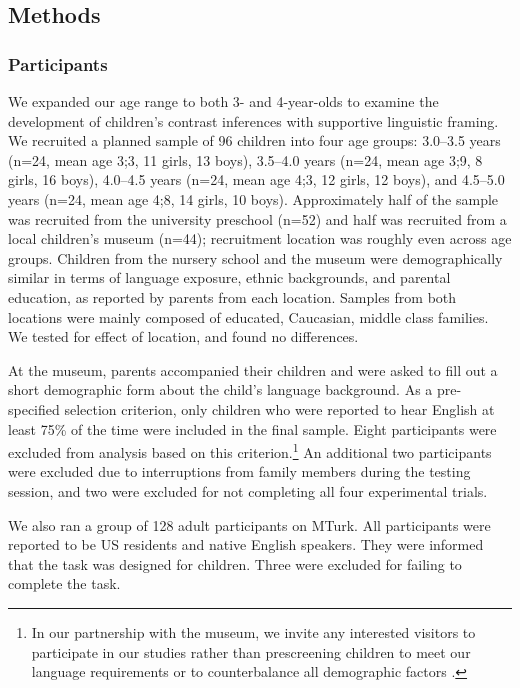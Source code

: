 \documentclass[man]{apa2}
\begin{document}
\subsection{Methods}

\subsubsection{Participants}

We expanded our age range to both 3- and 4-year-olds to examine the development of children's contrast inferences with supportive linguistic framing. We recruited a planned sample of 96 children into four age groups: 3.0--3.5 years (n=24, mean age 3;3, 11 girls, 13 boys), 3.5--4.0 years (n=24, mean age 3;9, 8 girls, 16 boys), 4.0--4.5 years (n=24, mean age 4;3, 12 girls, 12 boys), and 4.5--5.0 years (n=24, mean age 4;8, 14 girls, 10 boys).  Approximately half of the sample was recruited from the university preschool (n=52) and half was recruited from a local children's museum (n=44); recruitment location was roughly even across age groups. Children from the nursery school and the museum were demographically similar in terms of language exposure, ethnic backgrounds, and parental education, as reported by parents from each location. Samples from both locations were mainly composed of educated, Caucasian, middle class families. We tested for effect of location, and found no differences.

At the museum, parents accompanied their children and were asked to fill out a short demographic form about the child's language background. As a pre-specified selection criterion, only children who were reported to hear English at least 75\% of the time were included in the final sample.  Eight participants were excluded from analysis based on this criterion.\footnote{In our partnership with the museum, we invite any interested visitors to participate in our studies rather than prescreening children to meet our language requirements or to counterbalance all demographic factors \cite{callanan2012}. }  An additional two participants were excluded due to interruptions from family members during the testing session, and two were excluded for not completing all four experimental trials. 


We also ran a group of 128 adult participants on MTurk.  All participants were reported to be US residents and native English speakers.  They were informed that the task was designed for children. Three were excluded for failing to complete the task. 
\end{document}
